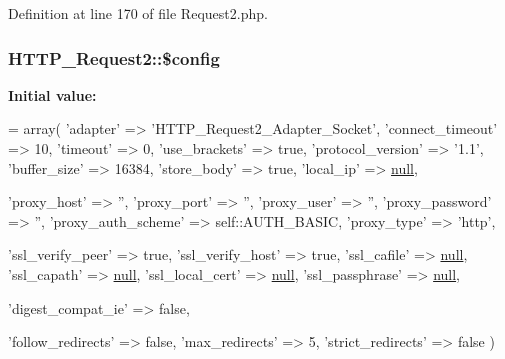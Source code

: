 Definition at line 170 of file Request2.\+php.

\subsubsection[{\texorpdfstring{\$config}{$config}}]{\setlength{\rightskip}{0pt plus 5cm}H\+T\+T\+P\+\_\+\+Request2\+::\$config\hspace{0.3cm}{\ttfamily [protected]}}\hypertarget{classHTTP__Request2_a4043f1c6f00d8b92d2b3dcb5ecd2861e}{}\label{classHTTP__Request2_a4043f1c6f00d8b92d2b3dcb5ecd2861e}
{\bfseries Initial value\+:}
\begin{DoxyCode}
= array(
        \textcolor{stringliteral}{'adapter'}           => \textcolor{stringliteral}{'HTTP\_Request2\_Adapter\_Socket'},
        \textcolor{stringliteral}{'connect\_timeout'}   => 10,
        \textcolor{stringliteral}{'timeout'}           => 0,
        \textcolor{stringliteral}{'use\_brackets'}      => \textcolor{keyword}{true},
        \textcolor{stringliteral}{'protocol\_version'}  => \textcolor{stringliteral}{'1.1'},
        \textcolor{stringliteral}{'buffer\_size'}       => 16384,
        \textcolor{stringliteral}{'store\_body'}        => \textcolor{keyword}{true},
        \textcolor{stringliteral}{'local\_ip'}          => \hyperlink{modernizr_8min_8js_a286f9ec831c5e676eeb493248eab9575}{null},

        \textcolor{stringliteral}{'proxy\_host'}        => \textcolor{stringliteral}{''},
        \textcolor{stringliteral}{'proxy\_port'}        => \textcolor{stringliteral}{''},
        \textcolor{stringliteral}{'proxy\_user'}        => \textcolor{stringliteral}{''},
        \textcolor{stringliteral}{'proxy\_password'}    => \textcolor{stringliteral}{''},
        \textcolor{stringliteral}{'proxy\_auth\_scheme'} => self::AUTH\_BASIC,
        \textcolor{stringliteral}{'proxy\_type'}        => \textcolor{stringliteral}{'http'},

        \textcolor{stringliteral}{'ssl\_verify\_peer'}   => \textcolor{keyword}{true},
        \textcolor{stringliteral}{'ssl\_verify\_host'}   => \textcolor{keyword}{true},
        \textcolor{stringliteral}{'ssl\_cafile'}        => \hyperlink{modernizr_8min_8js_a286f9ec831c5e676eeb493248eab9575}{null},
        \textcolor{stringliteral}{'ssl\_capath'}        => \hyperlink{modernizr_8min_8js_a286f9ec831c5e676eeb493248eab9575}{null},
        \textcolor{stringliteral}{'ssl\_local\_cert'}    => \hyperlink{modernizr_8min_8js_a286f9ec831c5e676eeb493248eab9575}{null},
        \textcolor{stringliteral}{'ssl\_passphrase'}    => \hyperlink{modernizr_8min_8js_a286f9ec831c5e676eeb493248eab9575}{null},

        \textcolor{stringliteral}{'digest\_compat\_ie'}  => \textcolor{keyword}{false},

        \textcolor{stringliteral}{'follow\_redirects'}  => \textcolor{keyword}{false},
        \textcolor{stringliteral}{'max\_redirects'}     => 5,
        \textcolor{stringliteral}{'strict\_redirects'}  => \textcolor{keyword}{false}
    )
\end{DoxyCode}


